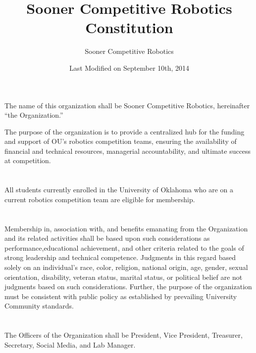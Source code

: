 \documentclass[12pt]{cls/constitution}
\begin{document}
\title{Sooner Competitive Robotics Constitution}
\author{Sooner Competitive Robotics}
\date{Last Modified on September 10th, 2014}
\maketitle
\setcounter{tocdepth}{0}
\tableofcontents
\newpage


The name of this organization shall be Sooner Competitive Robotics,  hereinafter “the Organization.”


The purpose of the organization is to provide a centralized hub for the funding and support of OU's robotics competition teams, ensuring the availability of financial and technical resources, managerial accountability, and ultimate success at competition. 


\section{}
All students currently enrolled in the University of Oklahoma who are on a current robotics competition team are eligible for membership. 

\section{}
Membership in, association with, and benefits emanating from the Organization and its related activities shall be based upon such considerations as performance,educational achievement, and other criteria related to the goals of strong leadership and technical competence. Judgments in this regard based solely on an individual’s race, color, religion, national origin, age, gender, sexual orientation, disability, veteran status, marital status, or political belief are not judgments based on such considerations. Further, the purpose of the organization must be consistent with public policy as established by prevailing University Community standards.  


\section{}
The Officers of the Organization shall be President, Vice President, Treasurer, Secretary, Social Media, and Lab Manager.
\end{document}
